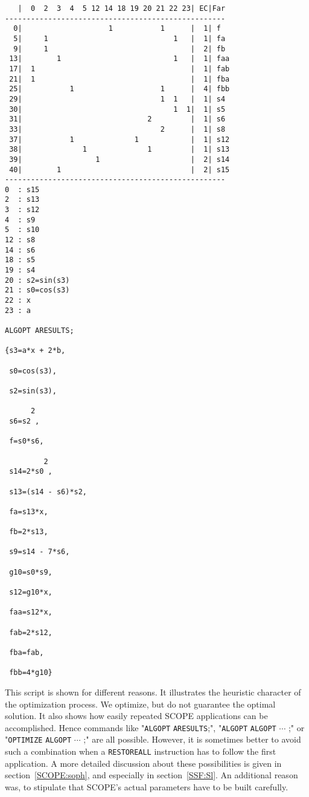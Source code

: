 {\begin{verbatim}
   |  0  2  3  4  5 12 14 18 19 20 21 22 23| EC|Far
---------------------------------------------------
  0|                    1           1      |  1| f
  5|     1                             1   |  1| fa
  9|     1                                 |  2| fb
 13|        1                          1   |  1| faa
 17|  1                                    |  1| fab
 21|  1                                    |  1| fba
 25|           1                    1      |  4| fbb
 29|                                1  1   |  1| s4
 30|                                   1  1|  1| s5
 31|                             2         |  1| s6
 33|                                2      |  1| s8
 37|           1              1            |  1| s12
 38|              1              1         |  1| s13
 39|                 1                     |  2| s14
 40|        1                              |  2| s15
---------------------------------------------------
0  : s15
2  : s13
3  : s12
4  : s9
5  : s10
12 : s8
14 : s6
18 : s5
19 : s4
20 : s2=sin(s3)
21 : s0=cos(s3)
22 : x
23 : a

ALGOPT ARESULTS;

{s3=a*x + 2*b,

 s0=cos(s3),

 s2=sin(s3),

      2
 s6=s2 ,

 f=s0*s6,

         2
 s14=2*s0 ,

 s13=(s14 - s6)*s2,

 fa=s13*x,

 fb=2*s13,

 s9=s14 - 7*s6,

 g10=s0*s9,

 s12=g10*x,

 faa=s12*x,

 fab=2*s12,

 fba=fab,

 fbb=4*g10}
\end{verbatim}}
This script is shown for different reasons. It illustrates the heuristic
character of the optimization process. We optimize, but do not guarantee
the optimal solution. It also shows how easily repeated SCOPE applications
can be accomplished. Hence commands like "{\tt ALGOPT} {\tt ARESULTS};",
"{\tt ALGOPT} {\tt ALGOPT} $\cdots$ ;"
or "{\tt OPTIMIZE} {\tt ALGOPT} $\cdots$ ;" are all possible.
However, it is sometimes better to avoid such a combination when a
{\tt RESTOREALL} instruction has to follow the first application.
A more detailed discussion about these possibilities is given in
section~\ref{SCOPE:soph}, and especially in section~\ref{SSF:Sl}.
An additional reason was, to stipulate that SCOPE's actual parameters
have to be built carefully.

